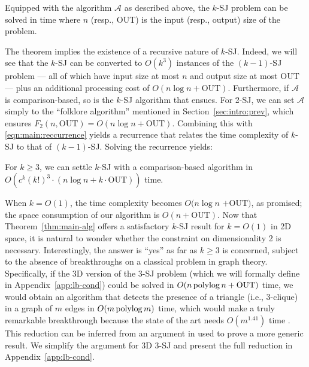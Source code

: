 \documentclass[sigconf]{acmart}
\def\A{\mathcal{A}}
\def\out{\mathrm{OUT}}
\begin{document}
\begin{theorem} \label{thm:main-recur}
    Equipped with the algorithm $\A$ as described above, the $k$-SJ problem can be solved in time
    \myeqn{
        O(k^3) \cdot \big( F_{k-1}(n, \out) + n \log n + k \cdot \out \big)
        \label{eqn:main:reccurrence}
    }
    where $n$ (resp., $\out$) is the input (resp., output) size of the problem.
\end{theorem}

The theorem implies the existence of a recursive nature of $k$-SJ. Indeed, we will see that the $k$-SJ can be converted to $O(k^3)$ instances of the $(k-1)$-SJ problem --- all of which have input size at most $n$ and output size at most $\out$ --- plus an additional processing cost of $O(n \log n + \out)$. Furthermore, if $\A$ is comparison-based, so is the $k$-SJ algorithm that ensues. For 2-SJ, we can set $\A$ simply to the ``folklore algorithm'' mentioned in Section~\ref{sec:intro:prev}, which ensures $F_2(n, \out) = O(n \log n + \out)$. Combining this with \eqref{eqn:main:reccurrence} yields a recurrence that relates the time complexity of $k$-SJ to that of $(k-1)$-SJ. Solving the recurrence yields:

\begin{theorem} \label{thm:main-alg}
    For $k \ge 3$, we can settle $k$-SJ with a comparison-based algorithm in $O( c^k (k!)^3 \cdot (n \log n + k \cdot \out))$ time.
\end{theorem}


When $k = O(1)$, the time complexity becomes $O(n \log n$ $+ \out)$, as promised; the space consumption of our algorithm is $O(n + \out)$. Now that Theorem~\ref{thm:main-alg} offers a satisfactory $k$-SJ result for $k = O(1)$ in 2D space, it is natural to wonder whether the constraint on dimensionality 2 is necessary. Interestingly, the answer is ``yes'' as far as $k \ge 3$ is concerned, subject to the absence of breakthroughs on a classical problem in graph theory. Specifically, if the 3D version of the 3-SJ problem (which we will formally define in Appendix~\ref{app:lb-cond}) could be solved in $O(n \polylog n + \out)$ time, we would obtain an algorithm that detects the presence of a triangle (i.e., 3-clique) in a graph of $m$ edges in $O(m \operatorname*{polylog} m)$ time, which would make a truly remarkable breakthrough because the state of the art needs $O(m^{1.41})$ time \cite{ayz97}. This reduction can be inferred from an argument in \cite{kcko22} used to prove a more generic result. We simplify the argument for 3D 3-SJ and present the full reduction in Appendix~\ref{app:lb-cond}.
\end{document}
